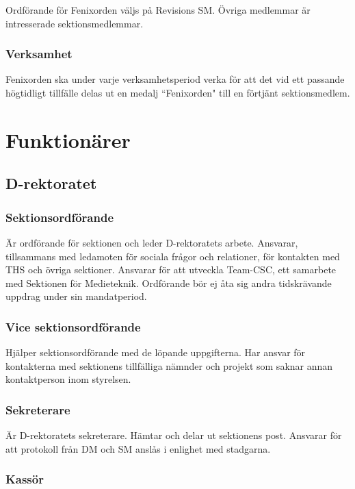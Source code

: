 \documentclass[a4paper,12pt]{article}
\begin{document}
Ordförande för Fenixorden väljs på Revisions SM. Övriga medlemmar är intresserade sektionsmedlemmar.

\subsubsection{Verksamhet}

Fenixorden ska under varje verksamhetsperiod verka för att det vid ett passande högtidligt tillfälle delas ut en medalj ``Fenixorden" till en förtjänt sektionsmedlem.

\section{Funktionärer}

\subsection{D-rektoratet}

\subsubsection{Sektionsordförande}

Är ordförande för sektionen och leder D-rektoratets arbete. Ansvarar, tillsammans med ledamoten för sociala frågor och relationer, för kontakten med THS och övriga sektioner. Ansvarar för att utveckla Team-CSC, ett samarbete med Sektionen för Medieteknik. Ordförande bör ej åta sig andra tidskrävande uppdrag under sin mandatperiod.

\subsubsection{Vice sektionsordförande}

Hjälper sektionsordförande med de löpande uppgifterna.
Har ansvar för kontakterna med sektionens tillfälliga nämnder och projekt som saknar annan kontaktperson inom styrelsen.

\subsubsection{Sekreterare}

Är D-rektoratets sekreterare. Hämtar och delar ut sektionens post.
Ansvarar för att protokoll från DM och SM anslås i enlighet med stadgarna.

\subsubsection{Kassör}
\end{document}
